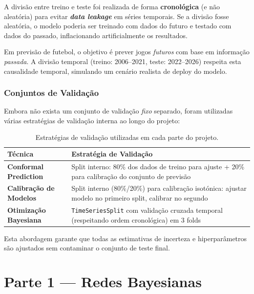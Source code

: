 \documentclass[12pt, a4paper]{article}
\begin{document}
A divisão entre treino e teste foi realizada de forma \textbf{cronológica} (e não aleatória) para evitar \textbf{\textit{data leakage}} em séries temporais. Se a divisão fosse aleatória, o modelo poderia ser treinado com dados do futuro e testado com dados do passado, inflacionando artificialmente os resultados.

Em previsão de futebol, o objetivo é prever jogos \textit{futuros} com base em informação \textit{passada}. A divisão temporal (treino: 2006--2021, teste: 2022--2026) respeita esta causalidade temporal, simulando um cenário realista de deploy do modelo.

\subsubsection{Conjuntos de Validação}

Embora não exista um conjunto de validação \textit{fixo} separado, foram utilizadas várias estratégias de validação interna ao longo do projeto:

\begin{table}[H]
  \centering
  \caption{Estratégias de validação utilizadas em cada parte do projeto.}
  \begin{tabular}{lp{8cm}}
    \toprule
    \textbf{Técnica} & \textbf{Estratégia de Validação} \\
    \midrule
    \textbf{Conformal Prediction} & Split interno: 80\% dos dados de treino para ajuste + 20\% para calibração do conjunto de previsão \\[0.3cm]
    \textbf{Calibração de Modelos} & Split interno (80\%/20\%) para calibração isotónica: ajustar modelo no primeiro split, calibrar no segundo \\[0.3cm]
    \textbf{Otimização Bayesiana} & \texttt{TimeSeriesSplit} com validação cruzada temporal (respeitando ordem cronológica) em 3 folds \\
    \bottomrule
  \end{tabular}
  \label{tab:validation}
\end{table}

Esta abordagem garante que todas as estimativas de incerteza e hiperparâmetros são ajustados sem contaminar o conjunto de teste final.

\section{Parte 1 --- Redes Bayesianas}
\end{document}
